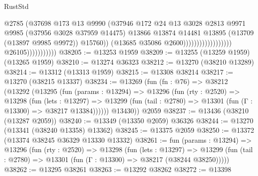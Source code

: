 \begin{lexlean}{RustStd}
\begin{coremodule}
                                                            @2785
                                                            (@37698
                                                              @173
                                                              @13
                                                              @9990
                                                              (@37946
                                                                @172
                                                                @24
                                                                @13
                                                                @3028
                                                                @2813
                                                                @9971
                                                                @9985
                                                                (@37956 @3028 @37959 @14475)
                                                                @13866
                                                                @13874
                                                                @14481
                                                                @13895
                                                                (@13709 (@13897 @9985 @9972))
                                                                @15760))
                                                            (@13685 @35086 @2600))))))))))))))))))
                          @26105)))))))))))
@38205 := @13253 @1959
@38209 := @13255 (@13259 @1959) (@13265 @1959)
@38210 := @13274 @36323
@38212 := @13270 (@38210 @13289)
@38214 := @13312 (@13313 @1959)
@38215 := @13308 @38214
@38217 := @13270 (@38215 @13337)
@38234 := @13269
    (fun (fn : @76) =>
    @38212
      (@13292
        (@13295
          (fun (params : @13294) =>
          @13296
            (fun (rty : @2520) =>
            @13298
              (fun (lets : @13297) =>
              @13299 (fun (tail : @2780) => @13301 (fun (Γ : @13300) => @38217 @13384))))))
        @13430))
    @2059
@38237 := @13436 (@38210 (@13287 @2059))
@38240 := @13349 (@13350 @2059) @36326
@38244 := @13270 (@13341 (@38240 @13358) @13362)
@38245 := @13375 @2059
@38250 := @13372 (@13374 @38245 @36329 @13330 @13332)
@38261 := fun (params : @13294) =>
  @13296
    (fun (rty : @2520) =>
    @13298
      (fun (lets : @13297) =>
      @13299 (fun (tail : @2780) => @13301 (fun (Γ : @13300) => @38217 (@38244 @38250)))))
@38262 := @13295 @38261
@38263 := @13292 @38262
@38272 := @13398

\end{coremodule}
\end{lexlean}
